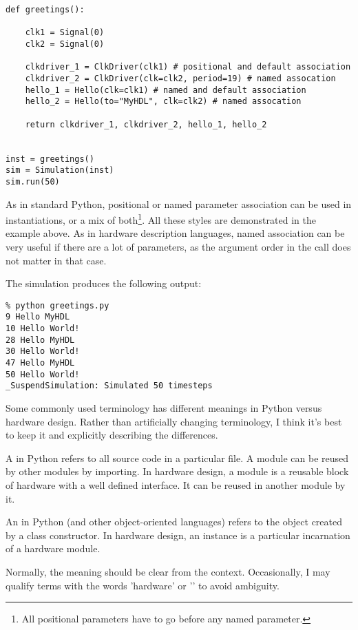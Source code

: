 \begin{verbatim}
def greetings():

    clk1 = Signal(0)
    clk2 = Signal(0)
    
    clkdriver_1 = ClkDriver(clk1) # positional and default association
    clkdriver_2 = ClkDriver(clk=clk2, period=19) # named assocation 
    hello_1 = Hello(clk=clk1) # named and default association
    hello_2 = Hello(to="MyHDL", clk=clk2) # named assocation

    return clkdriver_1, clkdriver_2, hello_1, hello_2


inst = greetings()
sim = Simulation(inst)
sim.run(50)
\end{verbatim}

As in standard Python, positional or named parameter association can
be used in instantiations, or a mix of both\footnote{All positional
parameters have to go before any named parameter.}. All these styles
are demonstrated in the example above. As in hardware description
languages, named association can be very useful if there are a lot of
parameters, as the argument order in the call does not matter in that
case.

The simulation produces the following output:

\begin{verbatim}
% python greetings.py
9 Hello MyHDL
10 Hello World!
28 Hello MyHDL
30 Hello World!
47 Hello MyHDL
50 Hello World!
_SuspendSimulation: Simulated 50 timesteps
\end{verbatim}


\begin{notice}[warning]
Some commonly used terminology has different meanings
in Python versus hardware design. Rather than artificially
changing terminology, I think it's best to keep it
and explicitly describing the differences.

A  in Python refers to all source code
in a particular file. A module can be reused by
other modules by importing. In hardware design,
%
a module is  a reusable block of hardware with
a well defined interface. It can be reused in 
another module by  it.

An  in Python (and other object-oriented
languages) refers to the object created by a
%
class constructor. In hardware design, an instance
is a particular incarnation of a hardware module.

Normally, the meaning should be clear from
the context. Occasionally, I may qualify terms 
with the words 'hardware' or '\myhdl{}' to 
avoid ambiguity.
\end{notice}


